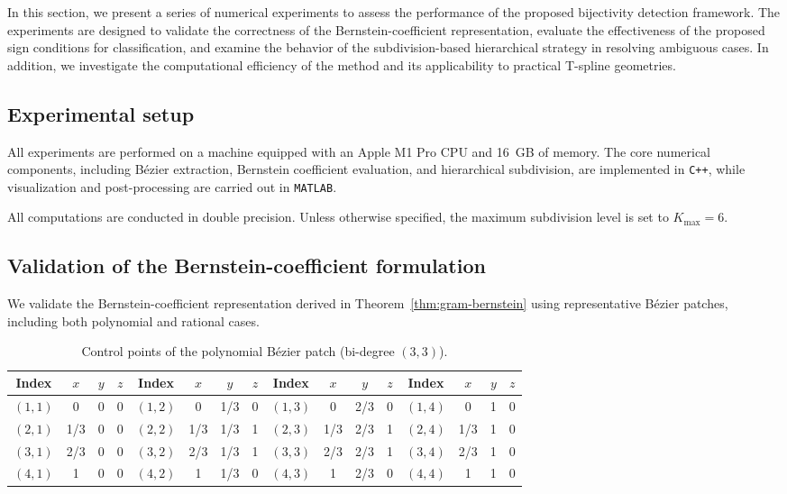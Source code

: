 \documentclass{jssc}
\begin{document}
In this section, we present a series of numerical experiments to assess the performance of the proposed bijectivity detection framework. The experiments are designed to validate the correctness of the Bernstein-coefficient representation, evaluate the effectiveness of the proposed sign conditions for classification, and examine the behavior of the subdivision-based hierarchical strategy in resolving ambiguous cases. In addition, we investigate the computational efficiency of the method and its applicability to practical T-spline geometries.

\subsection{Experimental setup}

All experiments are performed on a machine equipped with an Apple M1 Pro CPU and 16~GB of memory. The core numerical components, including B\'ezier extraction, Bernstein coefficient evaluation, and hierarchical subdivision, are implemented in \texttt{C++}, while visualization and post-processing are carried out in \texttt{MATLAB}.

All computations are conducted in double precision. Unless otherwise specified, the maximum subdivision level is set to $K_{\max} = 6$.

\subsection{Validation of the Bernstein-coefficient formulation}

We validate the Bernstein-coefficient representation derived in Theorem~\ref{thm:gram-bernstein} using representative B\'ezier patches, including both polynomial and rational cases.

\begin{table}
\centering
\caption{Control points of the polynomial B\'ezier patch (bi-degree $(3,3)$).}
\label{tab:control-points}
\begin{tabular}{c c c c c c c c c c c c c c c c}
\hline
Index & $x$ & $y$ & $z$ &
Index & $x$ & $y$ & $z$ &
Index & $x$ & $y$ & $z$ &
Index & $x$ & $y$ & $z$ \\
\hline
$(1,1)$ & 0   & 0   & 0 
& $(1,2)$ & 0   & 1/3 & 0 
& $(1,3)$ & 0   & 2/3 & 0 
& $(1,4)$ & 0   & 1   & 0 \\
$(2,1)$ & 1/3 & 0   & 0 
& $(2,2)$ & 1/3 & 1/3 & 1 
& $(2,3)$ & 1/3 & 2/3 & 1 
& $(2,4)$ & 1/3 & 1   & 0 \\
$(3,1)$ & 2/3 & 0   & 0 
& $(3,2)$ & 2/3 & 1/3 & 1 
& $(3,3)$ & 2/3 & 2/3 & 1 
& $(3,4)$ & 2/3 & 1   & 0 \\
$(4,1)$ & 1   & 0   & 0 
& $(4,2)$ & 1   & 1/3 & 0 
& $(4,3)$ & 1   & 2/3 & 0 
& $(4,4)$ & 1   & 1   & 0 \\
\hline
\end{tabular}
\end{table}
\end{document}
